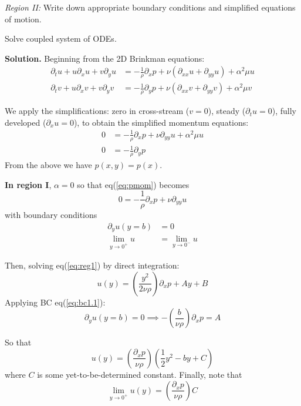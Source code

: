 \documentclass[11pt]{article}
\begin{document}
\textit{Region II:} Write down appropriate boundary conditions and simplified equations of motion.

Solve coupled system of ODEs.


\textbf{Solution.}
Beginning from the 2D Brinkman equations:
\begin{align}
  \partial_t u + u\partial_xu + v\partial_yu &= -\frac{1}{\rho}\partial_xp+\nu\left(\partial_{xx}u + \partial_{yy}u\right) + \alpha^2 \mu u\\
  \partial_t v + u\partial_xv + v\partial_yv &= -\frac{1}{\rho}\partial_yp+\nu\left(\partial_{xx}v + \partial_{yy}v\right) + \alpha^2 \mu v
\end{align}

We apply the simplifications: zero in cross-stream ($v = 0$), steady ($\partial_tu = 0$), fully developed ($\partial_xu=0$), to obtain the simplified momentum equations:
\begin{align}
  0 &= -\frac{1}{\rho}\partial_xp + \nu \partial_{yy}u + \alpha^2\mu u \label{eq:pmom}\\
  0 &= -\frac{1}{\rho}\partial_yp
\end{align}
From the above we have $p(x,y) = p(x)$.

\textbf{In region I}, $\alpha = 0$ so that eq(\ref{eq:pmom}) becomes
\begin{equation}
  0 = -\frac{1}{\rho}\partial_xp + \nu \partial_{yy}u\label{eq:reg1}
\end{equation}
with boundary conditions
\begin{align}
  \partial_yu(y=b) &= 0 \label{eq:bc1.1}\\
  \lim_{y\to 0^+}u &= \lim_{y\to 0^-}u \label{eq:bc1.2}
\end{align}

Then, solving eq(\ref{eq:reg1}) by direct integration:
\begin{equation}
  u(y) = \left(\frac{y^2}{2\nu \rho}\right)\partial_xp + Ay + B
\end{equation}
Applying BC eq(\ref{eq:bc1.1}):
\begin{equation}
  \partial_yu(y=b) = 0 \implies -\left(\frac{b}{\nu \rho}\right)\partial_xp = A 
\end{equation}

So that
\begin{equation}
  \label{eq:insolreg1}
  u(y) = \left( \frac{\partial_x p}{\nu \rho} \right)\left( \frac{1}{2}y^2 - by + C\right)
\end{equation}
where $C$ is some yet-to-be-determined constant. Finally, note that
\begin{equation}
  \label{eq:leftlim}
  \lim_{y\to 0^+}u(y) = \left( \frac{\partial_x p}{\nu \rho} \right)C
\end{equation}
\end{document}

